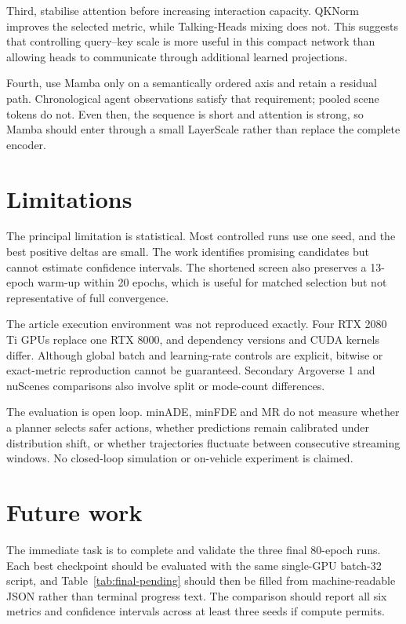 Third, stabilise attention before increasing interaction capacity. QKNorm improves the selected metric, while Talking-Heads mixing does not. This suggests that controlling query--key scale is more useful in this compact network than allowing heads to communicate through additional learned projections.

Fourth, use Mamba only on a semantically ordered axis and retain a residual path. Chronological agent observations satisfy that requirement; pooled scene tokens do not. Even then, the sequence is short and attention is strong, so Mamba should enter through a small LayerScale rather than replace the complete encoder.

\section{Limitations}

The principal limitation is statistical. Most controlled runs use one seed, and the best positive deltas are small. The work identifies promising candidates but cannot estimate confidence intervals. The shortened screen also preserves a 13-epoch warm-up within 20 epochs, which is useful for matched selection but not representative of full convergence.

The article execution environment was not reproduced exactly. Four RTX 2080 Ti GPUs replace one RTX 8000, and dependency versions and CUDA kernels differ. Although global batch and learning-rate controls are explicit, bitwise or exact-metric reproduction cannot be guaranteed. Secondary Argoverse 1 and nuScenes comparisons also involve split or mode-count differences.

The evaluation is open loop. minADE, minFDE and MR do not measure whether a planner selects safer actions, whether predictions remain calibrated under distribution shift, or whether trajectories fluctuate between consecutive streaming windows. No closed-loop simulation or on-vehicle experiment is claimed.

\section{Future work}

The immediate task is to complete and validate the three final 80-epoch runs. Each best checkpoint should be evaluated with the same single-GPU batch-32 script, and Table~\ref{tab:final-pending} should then be filled from machine-readable JSON rather than terminal progress text. The comparison should report all six metrics and confidence intervals across at least three seeds if compute permits.

